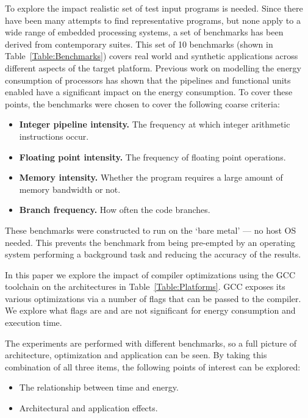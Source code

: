 \documentclass[twocolumn]{article}
\begin{document}
To explore the impact  realistic set of test input programs is needed. Since there have been many attempts to find representative programs, but none apply to a wide range of embedded processing systems, a set of benchmarks has been derived from contemporary suites. This set of 10 benchmarks (shown in Table~\ref{Table:Benchmarks}) covers real world and synthetic applications across different aspects of the target platform. Previous work on modelling the energy consumption of processors has shown that the pipelines and functional units enabled have a significant impact on the energy consumption. To cover these points, the benchmarks were chosen to cover the following coarse criteria:
\begin{itemize}
	\setlength{\itemsep}{0em}
	\vspace{-1mm}
	\item \textbf{Integer pipeline intensity.} The frequency at which integer arithmetic instructions occur.
	\item \textbf{Floating point intensity.} The frequency of floating point operations.
	\item \textbf{Memory intensity.} Whether the program requires a large amount of memory bandwidth or not.
	\item \textbf{Branch frequency.} How often the code branches.
\end{itemize}

These benchmarks were constructed to run on the `bare metal' --- no host OS needed. This prevents the benchmark from being pre-empted by an operating system performing a background task and reducing the accuracy of the results.

In this paper we explore the impact of compiler optimizations using the GCC toolchain on the architectures in Table~\ref{Table:Platforms}. GCC exposes its various optimizations via a number of flags that can be passed to the compiler. We explore what flags are and are not significant for energy consumption and execution time.

The experiments are performed with different benchmarks, so a full picture of architecture, optimization and application can be seen. By taking this combination of all three items, the following points of interest can be explored:
\begin{itemize}
	\setlength{\itemsep}{0em}
	\vspace{-1mm}
 	\item The relationship between time and energy.
 	\item Architectural and application effects.
 \end{itemize}
\end{document}
